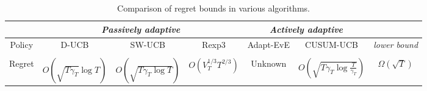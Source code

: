 \documentclass[letterpaper]{article}
\begin{document}
\begin{table}[t]
  \small
  \centering
  \caption{
  Comparison of regret bounds in various algorithms.
  }
  \label{table:regret}
  \tabcolsep 1pt
\begin{center}
    \begin{adjustbox}{width=0.23\columnwidth}
\begin{tabular}{|c|c|c|c|c|c|c|}
    \hline
    & \multicolumn{3}{c|}{\em Passively adaptive} &
                                                   \multicolumn{2}{c|}{\em
                                                   Actively adaptive}
      & \\
    \hline
    \multirow{2}{*}{Policy} & D-UCB & SW-UCB & Rexp3
    & Adapt-EvE  & CUSUM-UCB & {\em lower bound}\\
    &  {\scriptsize\cite{kocsis2006discounted}}& {\scriptsize\cite{garivier2008upper}}& {\scriptsize\cite{besbes2014stochastic}} & {\scriptsize\cite{hartland2007change}}  & & {\scriptsize \cite{garivier2008upper}}\\
    \hline
    Regret & $O(\sqrt{T\gamma_T}\log T)$ & $O(\sqrt{T\gamma_T\log T})$ & $O(V_T^{1/3}T^{2/3})$
    & Unknown & $O(\sqrt{T\gamma_T\log{\frac{T}{\gamma_T}}})$ & $\Omega(\sqrt{T})$\\
    \hline
  \end{tabular}
\end{adjustbox}
\end{center}
  \label{tbl:regret_comparison}
\end{table}
\end{document}

